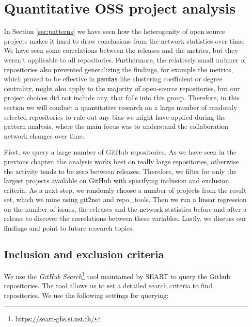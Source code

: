 
\section{Quantitative OSS project analysis}
\label{sec:quantitative}

In Section \ref{sec:patterns} we have seen how the heterogenity of open source projects makes it hard to draw conclusions from the network statistics over time. We have seen some correlations between the releases and the metrics, but they weren't applicable to all repositories. Furthermore, the relatively small nubmer of repositories also prevented generalizing the findings, for example the metrics, which proved to be effective in \texttt{pandas} like clustering coefficient or degree centrality, might also apply to the majority of open-source repositories, but our project choices did not include any, that falls into this group. Therefore, in this section we will conduct a quantitative research on a large number of randomly selected repositories to rule out any bias we might have applied during the pattern analysis, where the main focus was to understand the collaboration network changes over time.

First, we query a large number of GitHub repositories. As we have seen in the previous chapter, the analysis works best on really large repositories, otherwise the activity tends to be zero between releases. Therefore, we filter for only the largest projects available on GitHub with specifying inclusion and exclusion criteria. As a next step, we randomly choose a number of projects from the result set, which we mine using git2net and repo\_tools. Then we run a linear regression on the number of issues, the releases and the network statistics before and after a release to discover the correlations between these variables. Lastly, we discuss our findings and point to future research topics.

\subsection{Inclusion and exclusion criteria}

We use the \textit{GitHub Search}\footnote{\url{https://seart-ghs.si.usi.ch/}} tool maintained by SEART to query the Github repositories. The tool allows us to set a detailed search criteria to find repositories. We use the following settings for querying:

